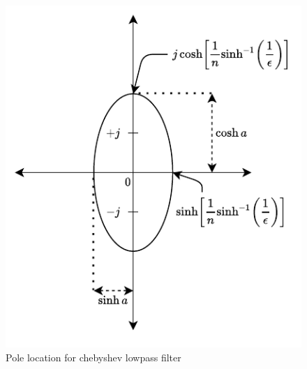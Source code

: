 \begin{figure}[H]
    \centering
    \includegraphics[]{../Figures/pole_location_chebyshev}
    \caption{Pole location for chebyshev lowpass filter}
    \label{fig:chebyshev-pole}
\end{figure}